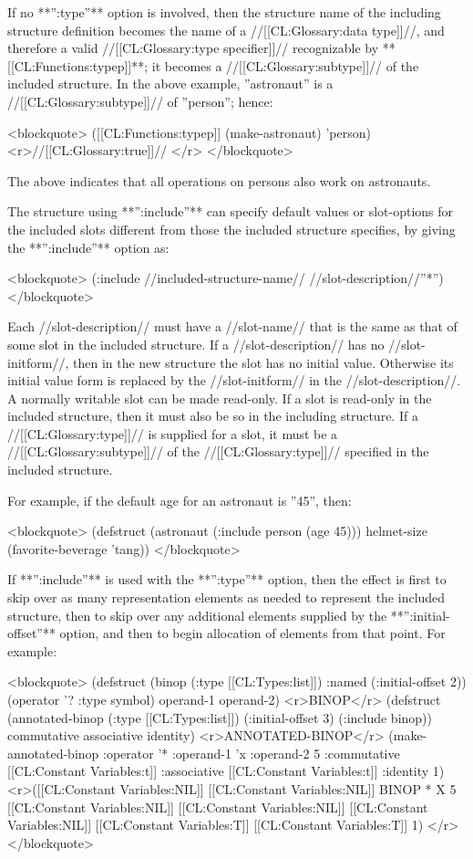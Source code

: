 If no **'':type''** option is involved, then the structure name of the including structure definition becomes the name of a //[[CL:Glossary:data type]]//, and therefore a valid //[[CL:Glossary:type specifier]]// recognizable by **[[CL:Functions:typep]]**; it becomes a //[[CL:Glossary:subtype]]// of the included structure. In the above example, ''astronaut'' is a //[[CL:Glossary:subtype]]// of ''person''; hence:

<blockquote> 
([[CL:Functions:typep]] (make-astronaut) 'person) <r>//[[CL:Glossary:true]]// </r>
</blockquote> 

The above indicates that all operations on persons also work on astronauts.

The structure using **'':include''** can specify default values or slot-options for the included slots different from those the included structure specifies, by giving the **'':include''** option as:

<blockquote> 
(:include //included-structure-name// //slot-description//''*'') 
</blockquote> 

Each //slot-description// must have a //slot-name// that is the same as that of some slot in the included structure. If a //slot-description// has no //slot-initform//, then in the new structure the slot has no initial value. Otherwise its initial value form is replaced by the //slot-initform// in the //slot-description//. A normally writable slot can be made read-only. If a slot is read-only in the included structure, then it must also be so in the including structure. If a //[[CL:Glossary:type]]// is supplied for a slot, it must be a //[[CL:Glossary:subtype]]// of the //[[CL:Glossary:type]]// specified in the included structure.

For example, if the default age for an astronaut is ''45'', then:

<blockquote> 
(defstruct (astronaut (:include person (age 45))) 
  helmet-size 
  (favorite-beverage 'tang)) 
</blockquote>

If **'':include''** is used with the **'':type''** option, then the effect is first to skip over as many representation elements as needed to represent the included structure, then to skip over any additional elements supplied by the **'':initial-offset''** option, and then to begin allocation of elements from that point. For example:

<blockquote> 
(defstruct (binop (:type [[CL:Types:list]]) 
                  :named 
                  (:initial-offset 2))
  (operator '? :type symbol) 
  operand-1 
  operand-2) <r>BINOP</r>
(defstruct (annotated-binop (:type [[CL:Types:list]]) 
                            (:initial-offset 3)
                            (:include binop))
  commutative 
  associative 
  identity) <r>ANNOTATED-BINOP</r>
(make-annotated-binop :operator '* 
                      :operand-1 'x 
                      :operand-2 5 
                      :commutative [[CL:Constant Variables:t]] 
                      :associative [[CL:Constant Variables:t]] 
                      :identity 1) 
<r>([[CL:Constant Variables:NIL]] [[CL:Constant Variables:NIL]] BINOP * X 5 [[CL:Constant Variables:NIL]] [[CL:Constant Variables:NIL]] [[CL:Constant Variables:NIL]] [[CL:Constant Variables:T]] [[CL:Constant Variables:T]] 1) </r>
</blockquote> 

